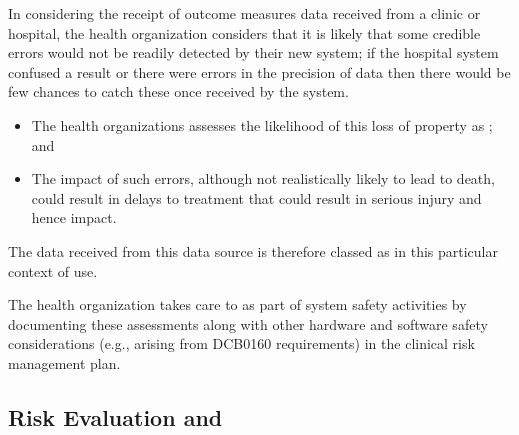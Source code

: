 In considering the receipt of outcome measures data received from a clinic or hospital, the health organization considers that it is likely that some credible errors would not be readily detected by their new system; if the hospital system confused a result or there were errors in the precision of data then there would be few chances to catch these once received by the system.
\begin{itemize}
  \item The health organizations assesses the likelihood of this loss of property as ; and
  \item The impact of such errors, although not realistically likely to lead to death, could result in delays to treatment that could result in serious injury and hence  impact.
\end{itemize}

The data received from this data source is therefore classed as  in this particular context of use.

The health organization takes care to  as part of system safety activities by documenting these assessments along with other hardware and software safety considerations (e.g., arising from DCB0160 requirements) in the clinical risk management plan.

\subsection{Risk Evaluation and }

